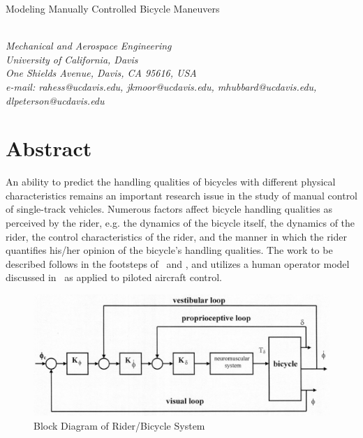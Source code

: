 \documentclass{bmd2010a}
\begin{document}
\begin{flushleft}
{\fontsize{16pt}{20pt}\selectfont%
  Modeling Manually Controlled Bicycle Maneuvers\\}
\end{flushleft}

\begin{flushleft}
  {\\}
  \textit{Mechanical and Aerospace Engineering\\
          University of California, Davis\\
          One Shields Avenue, Davis, CA 95616, USA\\
          e-mail: rahess@ucdavis.edu, jkmoor@ucdavis.edu, mhubbard@ucdavis.edu,
          dlpeterson@ucdavis.edu
  }\vspace{10pt}\\
\end{flushleft}

\section*{Abstract}
An ability to predict the handling qualities of bicycles with different
physical characteristics remains an important research issue in the study of
manual control of single-track vehicles. Numerous factors affect bicycle
handling qualities as perceived by the rider, e.g. the dynamics of the bicycle
itself, the dynamics of the rider, the control characteristics of the rider,
and the manner in which the rider quantifies his/her opinion of the bicycle's
handling qualities. The work to be described follows in the footsteps
of~\cite{Lunteren1970} and \cite{Weir1972}, and utilizes a human operator model
discussed in~\cite{Hess2006} as applied to piloted aircraft control.
\begin{figure}[hb]
    \centering
    \includegraphics[width=0.65\columnwidth]{block.jpg}
    \caption{Block Diagram of Rider/Bicycle System}
    \label{fig:block}
\end{figure}
\end{document}
